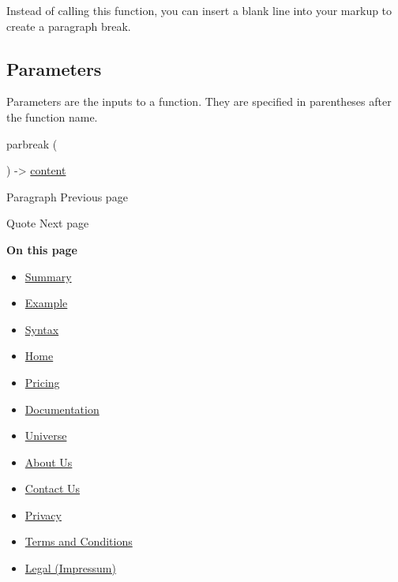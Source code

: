 Instead of calling this function, you can insert a blank line into your
markup to create a paragraph break.

\subsection{\texorpdfstring{{ Parameters
}}{ Parameters }}\label{parameters}

\label{parameters-tooltip}
Parameters are the inputs to a function. They are specified in
parentheses after the function name.

{ parbreak } (

) -\textgreater{} \href{/docs/reference/foundations/content/}{content}

\href{/docs/reference/model/par/}{\pandocbounded{}}

{ Paragraph } { Previous page }

\href{/docs/reference/model/quote/}{\pandocbounded{}}

{ Quote } { Next page }

\textbf{On this page}

\begin{itemize}
\tightlist
\item
  \hyperref[summary]{Summary}
\item
  \hyperref[example]{Example}
\item
  \hyperref[syntax]{Syntax}
\end{itemize}

\begin{itemize}
\tightlist
\item
  \href{/}{Home}
\item
  \href{/pricing/}{Pricing}
\item
  \href{/docs/}{Documentation}
\item
  \href{/universe/}{Universe}
\item
  \href{/about/}{About Us}
\item
  \href{/contact/}{Contact Us}
\item
  \href{/privacy/}{Privacy}
\item
  \href{https://typst.app/terms}{Terms and Conditions}
\item
  \href{/legal/}{Legal (Impressum)}
\end{itemize}

